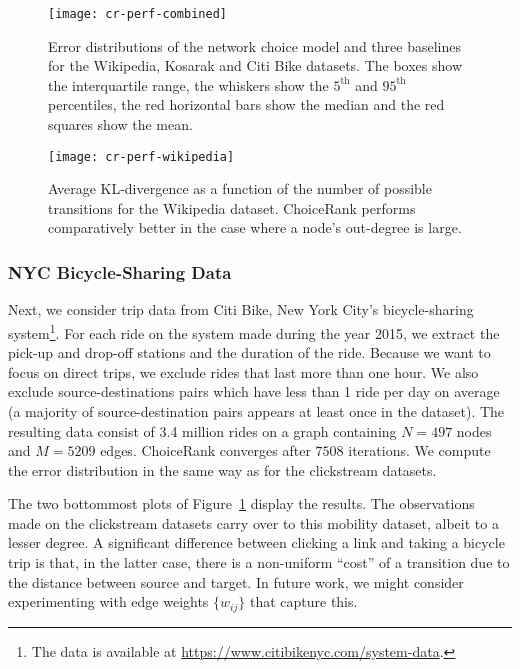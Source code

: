 \begin{figure}
  \centering
  \texttt{[image: cr-perf-combined]}
  \caption{
Error distributions of the network choice model and three baselines for the Wikipedia, Kosarak and Citi Bike datasets.
The boxes show the interquartile range, the whiskers show the $5^{\text{th}}$ and $95^{\text{th}}$ percentiles, the red horizontal bars show the median and the red squares show the mean.
}
  \label{cr:fig:perf-combined}
\end{figure}

\begin{figure}
  \centering
  \texttt{[image: cr-perf-wikipedia]}
  \caption{
Average KL-divergence as a function of the number of possible transitions for the Wikipedia dataset.
ChoiceRank performs comparatively better in the case where a node's out-degree is large.
}
  \label{cr:fig:perf-wikipedia}
\end{figure}


\subsubsection{NYC Bicycle-Sharing Data}

Next, we consider trip data from Citi Bike, New York City's bicycle-sharing system\footnote{The data is available at \url{https://www.citibikenyc.com/system-data}.}.
For each ride on the system made during the year 2015, we extract the pick-up and drop-off stations and the duration of the ride.
Because we want to focus on direct trips, we exclude rides that last more than one hour.
We also exclude source-destinations pairs which have less than 1 ride per day on average (a majority of source-destination pairs appears at least once in the dataset).
The resulting data consist of \num{3.4} million rides on a graph containing $N = \num{497}$ nodes and $M = \num{5209}$ edges.
ChoiceRank converges after $\num{7508}$ iterations.
We compute the error distribution in the same way as for the clickstream datasets.

The two bottommost plots of Figure~\ref{cr:fig:perf-combined} display the results.
The observations made on the clickstream datasets carry over to this mobility dataset, albeit to a lesser degree.
A significant difference between clicking a link and taking a bicycle trip is that, in the latter case, there is a non-uniform ``cost'' of a transition due to the distance between source and target.
In future work, we might consider experimenting with edge weights $\{ w_{ij} \}$ that capture this.


